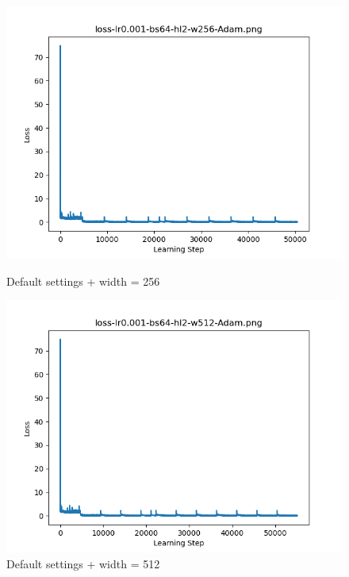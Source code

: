 \documentclass{article}[12pt]
\begin{document}
        \begin{figure}[H]
        \includegraphics[width=\linewidth]{testsResults/loss/w/loss-lr0.001-bs64-hl2-w256-Adam.png}
        \caption{Default settings + width = 256}
        \endminipage
        \includegraphics[width=\linewidth]{testsResults/loss/w/loss-lr0.001-bs64-hl2-w512-Adam.png}
        \caption{Default settings + width = 512}
        \endminipage
    \end{figure}
\end{document}
